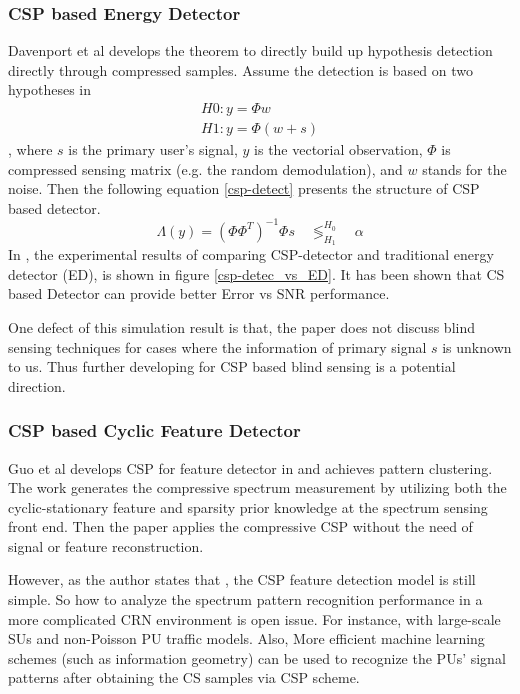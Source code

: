 \subsubsection{CSP based Energy Detector}
Davenport et al \cite{davenport2010signal} develops the theorem to directly build up hypothesis detection directly through compressed samples. Assume the detection is based on two hypotheses in 
\begin{equation}
\begin{aligned}
H0: y = \Phi w  \\
H1: y = \Phi (w + s)
\end{aligned}
\end{equation}
, where $s$ is the primary user's signal, $y$ is the vectorial observation, $\Phi$ is compressed sensing matrix (e.g. the random demodulation), and $w$ stands for the noise. Then the following equation \ref{csp-detect} presents the structure of CSP based detector. 
\begin{equation}
\label{csp-detect}
\Lambda(y) = (\Phi \Phi^T)^{-1} \Phi s \quad \mathop{\lessgtr}_{H_1}^{H_0} \quad \alpha
\end{equation}
In \cite{appaiah2013spectrum}, the experimental results of comparing CSP-detector and traditional energy detector (ED), is shown in figure \ref{csp-detec_vs_ED}. It has been shown that CS based Detector can provide better Error vs SNR performance. 

One defect of this simulation result is that, the paper does not discuss blind sensing techniques for cases where the information of primary signal $s$ is unknown to us. Thus further developing for CSP based blind sensing is a potential direction. 

\subsubsection{CSP based Cyclic Feature Detector}
Guo et al \cite{guo2013feature} develops CSP for feature detector in  and achieves pattern clustering.
The work generates the compressive spectrum measurement by utilizing both the cyclic-stationary feature and sparsity prior knowledge at the spectrum sensing front end. Then the paper applies the compressive CSP without the need of signal or feature reconstruction. 

However, as the author states that \cite{guo2013feature}, the CSP feature detection model is still simple. So how to analyze the spectrum pattern recognition performance in a more complicated CRN environment is open issue. For instance, with large-scale SUs and non-Poisson PU traffic models. Also, More efficient machine learning schemes (such as information geometry) can be used to recognize the PUs’ signal patterns after obtaining the CS samples via CSP scheme. 

